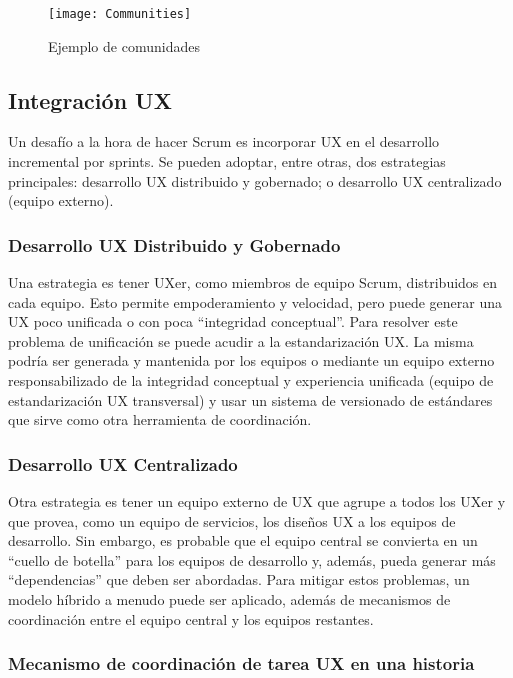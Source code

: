 \begin{figure}[h]
  \centering
  \texttt{[image: Communities]}
  \caption{Ejemplo de comunidades}
  \centering
  \label{fig:Communities} %
\end{figure}


\subsection{Integración UX}

Un desafío a la hora de hacer Scrum es incorporar UX en el desarrollo incremental por sprints. Se pueden adoptar, entre otras, dos estrategias principales: desarrollo UX distribuido y gobernado; o desarrollo UX centralizado (equipo externo).

\subsubsection{Desarrollo UX Distribuido y Gobernado}

Una estrategia es tener UXer, como miembros de equipo Scrum, distribuidos en cada equipo. Esto permite empoderamiento y velocidad, pero puede generar una UX poco unificada o con poca “integridad conceptual”. Para resolver este problema de unificación se puede acudir a la estandarización UX. La misma podría ser generada y mantenida por los equipos o mediante un equipo externo responsabilizado de la integridad conceptual y experiencia unificada (equipo de estandarización UX transversal) y usar un sistema de versionado de estándares que sirve como otra herramienta de coordinación.

\subsubsection{Desarrollo UX Centralizado}

Otra estrategia es tener un equipo externo de UX que agrupe a todos los UXer y que provea, como un equipo de servicios, los diseños UX a los equipos de desarrollo. Sin embargo, es probable que el equipo central se convierta en un “cuello de botella” para los equipos de desarrollo y, además, pueda generar más “dependencias” que deben ser abordadas. Para mitigar estos problemas, un modelo híbrido a menudo puede ser aplicado, además de mecanismos de coordinación entre el equipo central y los equipos restantes.

\subsubsection{Mecanismo de coordinación de tarea UX en una historia}

